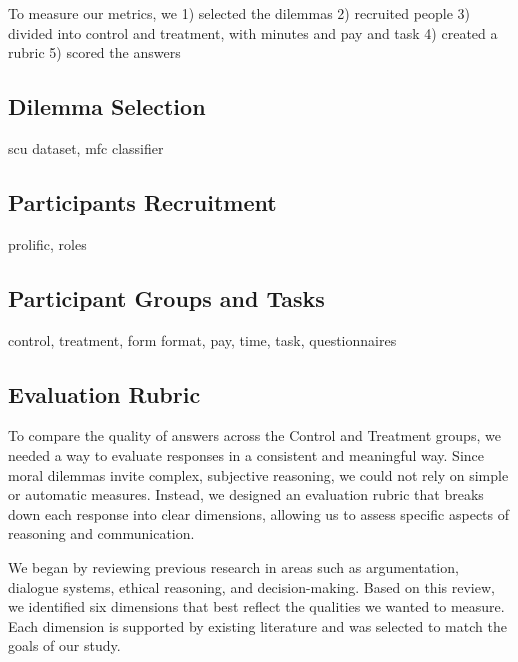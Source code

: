 \documentclass[sigconf, authorversion, nonacm, screen]{acmart}
\begin{document}
To measure our metrics, we 
1) selected the dilemmas
2) recruited people
3) divided into control and treatment, with minutes and pay and task
4) created a rubric 
5) scored the answers

\subsection{Dilemma Selection}
scu dataset, mfc classifier
\subsection{Participants Recruitment}
prolific, roles
\subsection{Participant Groups and Tasks}
control, treatment, form format, pay, time, task, questionnaires
\subsection{Evaluation Rubric}
To compare the quality of answers across the Control and Treatment groups, we needed a way to evaluate responses in a consistent and meaningful way. Since moral dilemmas invite complex, subjective reasoning, we could not rely on simple or automatic measures. Instead, we designed an evaluation rubric that breaks down each response into clear dimensions, allowing us to assess specific aspects of reasoning and communication.

We began by reviewing previous research in areas such as argumentation, dialogue systems, ethical reasoning, and decision-making. Based on this review, we identified six dimensions that best reflect the qualities we wanted to measure. Each dimension is supported by existing literature and was selected to match the goals of our study.
\end{document}
